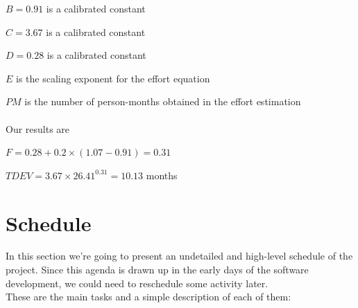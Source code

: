 \documentclass[english]{article}
\begin{document}
$B = 0.91$ is a calibrated constant

$C = 3.67$ is a calibrated constant

$D = 0.28$ is a calibrated constant

$E$ is the scaling exponent for the effort equation

$PM$ is the number of person-months obtained in the effort estimation
\paragraph{}
Our results are
\begin{center}
$F = 0.28 + 0.2 \times (1.07 - 0.91) = 0.31$
\end{center}

\begin{center}
$TDEV = 3.67 \times 26.41^{0.31} = 10.13$ months
\end{center}

\newpage
\section{Schedule}

In this section we're going to present an undetailed and high-level schedule of the project. Since this agenda is drawn up in the early days of the software development, we could need to reschedule some activity later.\\
These are the main tasks and a simple description of each of them:
\end{document}

